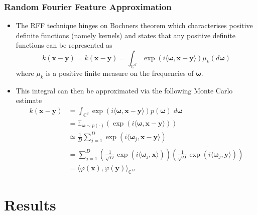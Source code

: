 \documentclass[9pt,hyperref={pdfpagelabels=false},xcolor=table]{beamer}
\begin{document}
\begin{frame}
    \frametitle{Random Fourier Feature Approximation}
    \begin{itemize}
        \item The RFF technique hinges on Bochners theorem which characterises positive definite functions (namely kernels) and states that any positive definite functions can be represented as
              \[
                  k \left( \bm{x} - \bm{y} \right) = k \left( \bm{x} - \bm{y} \right) = \int_{\mathbb{C}^d} \exp \left( i \langle \bm{\omega} , \bm{x} - \bm{y} \rangle \right) \mu_k \left( d \bm{\omega} \right)
              \]
              where $\mu_k$ is a positive finite measure on the frequencies of $\bm{\omega}$.
        \item This integral can then be approximated via the following Monte Carlo estimate
              \begin{align*}
                  k \left( \bm{x} - \bm{y} \right)
                   & = \int_{\mathbb{C}^d} \exp \left( i \langle \bm{\omega} , \bm{x} - \bm{y} \rangle \right) p (\bm{\omega}) \; d \bm{\omega}                                                                                                     \\
                   & = \mathbb{E}_{\bm{\omega} \sim p (\cdot)} \left( \exp \left( i \langle \bm{\omega} , \bm{x} - \bm{y} \rangle \right) \right)                                                                                                   \\
                   & \simeq \frac{1}{D} \sum_{j=1}^{D} \exp \left( i \langle \bm{\omega}_{j} , \bm{x} - \bm{y} \rangle \right)                                                                                                                      \\
                   & = \sum_{j=1}^{D} \left( \frac{1}{\sqrt{D}} \exp \left( i \langle \bm{\omega}_{j} , \bm{x} \rangle \right) \right) \overline{\left( \frac{1}{\sqrt{D}} \exp \left( i \langle \bm{\omega}_{j} , \bm{y} \rangle \right) \right) } \\
                   & = \langle \varphi (\bm{x}) , \varphi (\bm{y}) \rangle_{\mathbb{C}^D}
              \end{align*}
    \end{itemize}
\end{frame}

\section{Results}
\end{document}

